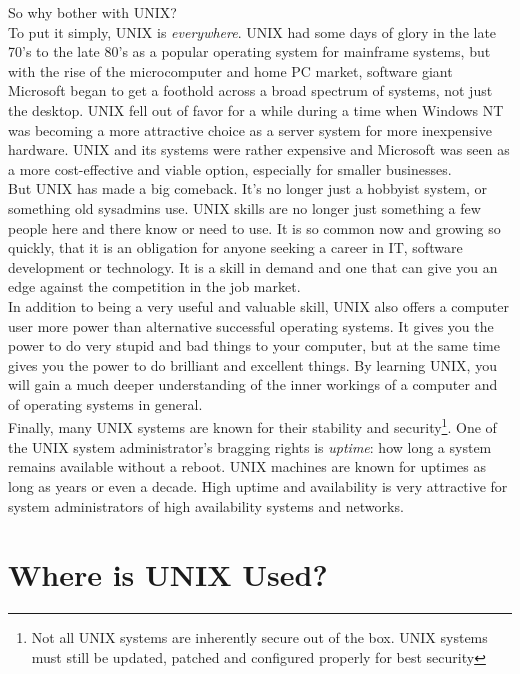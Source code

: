 So why bother with UNIX?\\

To put it simply, UNIX is \textit{everywhere}. UNIX had some days of glory in the late 70's to the late 80's as a popular operating system for mainframe systems, but with the rise of the microcomputer and home PC market, software giant Microsoft began to get a foothold across a broad spectrum of systems, not just the desktop. UNIX fell out of favor for a while during a time when Windows NT was becoming a more attractive choice as a server system for more inexpensive hardware. UNIX and its systems were rather expensive and Microsoft was seen as a more cost-effective and viable option, especially for smaller businesses.\\

But UNIX has made a big comeback. It's no longer just a hobbyist system, or something old sysadmins use. UNIX skills are no longer just something a few people here and there know or need to use. It is so common now and growing so quickly, that it is an obligation for anyone seeking a career in IT, software development or technology. It is a skill in demand and one that can give you an edge against the competition in the job market.\\

In addition to being a very useful and valuable skill, UNIX also offers a computer user more power than alternative successful operating systems. It gives you the power to do very stupid and bad things to your computer, but at the same time gives you the power to do brilliant and excellent things. By learning UNIX, you will gain a much deeper understanding of the inner workings of a computer and of operating systems in general.\\

Finally, many UNIX systems are known for their stability and security\footnote{Not all UNIX systems are inherently secure out of the box. UNIX systems must still be updated, patched and configured properly for best security}.  One of the UNIX system administrator's bragging rights is \textit{uptime}: how long a system remains available without a reboot.  UNIX machines are known for uptimes as long as years or even a decade.  High uptime and availability is very attractive for system administrators of high availability systems and networks.

\section{Where is UNIX Used?}

